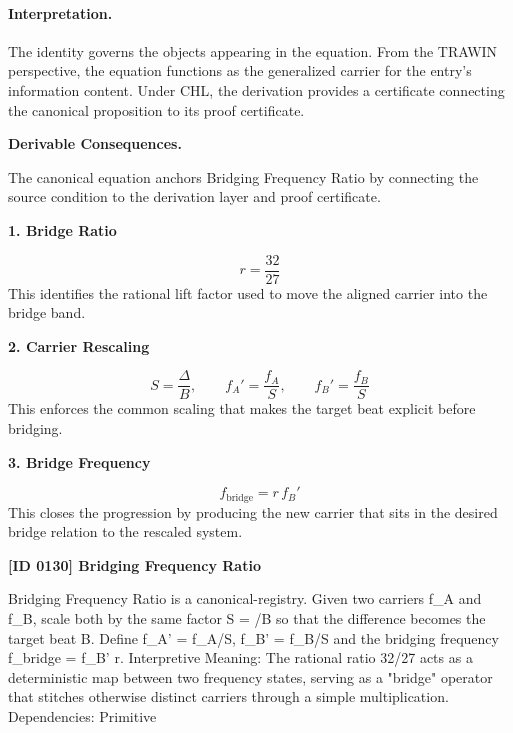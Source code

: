 \paragraph{Interpretation.}
The identity governs the objects appearing in the equation. From the TRAWIN perspective, the equation functions as the generalized carrier for the entry’s information content. Under CHL, the derivation provides a certificate connecting the canonical proposition to its proof certificate.

\par\vspace{0.35em}
\noindent\textbf{Derivable Consequences.}\quad
\begingroup
\footnotesize
\raggedright
The canonical equation anchors Bridging Frequency Ratio by connecting the source condition to the derivation layer and proof certificate.
\par\endgroup

\noindent\textbf{1. Bridge Ratio}\par
\[
r = \frac{32}{27}
\]
\noindent This identifies the rational lift factor used to move the aligned carrier into the bridge band.\par
\noindent\textbf{2. Carrier Rescaling}\par
\[
S = \frac{\Delta}{B},
\qquad
f_A' = \frac{f_A}{S},
\qquad
f_B' = \frac{f_B}{S}
\]
\noindent This enforces the common scaling that makes the target beat explicit before bridging.\par
\noindent\textbf{3. Bridge Frequency}\par
\[
f_{\mathrm{bridge}} = r\,f_B'
\]
\noindent This closes the progression by producing the new carrier that sits in the desired bridge relation to the rescaled system.\par

\clearpage
\noindent\textbf{[ID 0130] Bridging Frequency Ratio}\par
\vspace{0.35em}
\begingroup\small
{}
Bridging Frequency Ratio is a canonical-registry. Given two carriers f\_A and f\_B, scale both by the same factor S =  /B so that the difference becomes the target beat B. Define f\_A' = f\_A/S, f\_B' = f\_B/S and the bridging frequency f\_bridge = f\_B'   r. Interpretive Meaning: The rational ratio 32/27 acts as a deterministic map between two frequency states, serving as a "bridge" operator that stitches otherwise distinct carriers through a simple multiplication. Dependencies: Primitive

